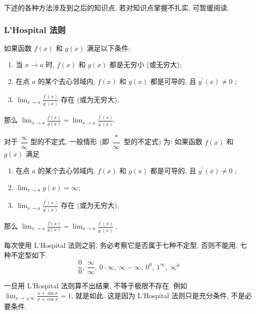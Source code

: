 下述的各种方法涉及到之后的知识点, 若对知识点掌握不扎实, 可暂缓阅读.

\subsubsection{L'Hospital 法则}

\begin{theorem}
    如果函数 $f(x)$ 和 $g(x)$ 满足以下条件:\label{LHospitalLaw}
    \begin{enumerate}[label=(\arabic{*})]
        \item 当 $ x \to a $ 时, $f(x) $ 和 $ g(x) $ 都是无穷小 (或无穷大);
        \item 在点 $ a $ 的某个去心邻域内, $f(x) $ 和 $ g(x) $ 都是可导的, 且 $ g^{\prime}(x) \neq 0$ ;
        \item $\displaystyle\lim _{x \to a} \frac{f^{\prime}(x)}{g^{\prime}(x)} $ 存在 (或为无穷大),
    \end{enumerate}
    那么 $ \displaystyle\lim _{x \to a} \frac{f(x)}{g(x)}=\lim _{x \to a} \frac{f^{\prime}(x)}{g^{\prime}(x)} .$
\end{theorem}

\begin{theorem}
    对于 $ \dfrac{\infty}{\infty} $ 型的不定式, 一般情形 (即 $ \dfrac{*}{\infty} $ 型的不定式) 为: 如果函数 $ f(x) $ 和 $ g(x) $ 满足
    \begin{enumerate}[label=(\arabic{*})]
        \item 在点 $ a $ 的某个去心邻域内, $f(x) $ 和 $ g(x) $ 都是可导的, 且 $ g^{\prime}(x) \neq 0$ ;
        \item $\displaystyle\lim _{x \to a} g(x)=\infty $;
        \item $\displaystyle\lim _{x \to a} \frac{f^{\prime}(x)}{g^{\prime}(x)} $ 存在 (或为无穷大),
    \end{enumerate}
    那么 $\displaystyle \lim _{x \to a} \frac{f(x)}{g(x)}=\lim _{x \to a} \frac{f^{\prime}(x)}{g^{\prime}(x)}$ .
\end{theorem}

每次使用 L'Hospital 法则之前, 务必考察它是否属于七种不定型, 否则不能用, 七种不定型如下.
$$\frac{0}{0},~\frac{\infty}{\infty},~0\cdot\infty,~\infty-\infty,~0^0,~1^\infty,~\infty^0$$

一旦用 L'Hospital 法则算不出结果, 不等于极限不存在. 例如 $\displaystyle\lim_{x\to\pm\infty}\frac{x+\sin x}{x+\cos x}=1$,
就是如此. 这是因为 L'Hospital 法则只是充分条件, 不是必要条件.

